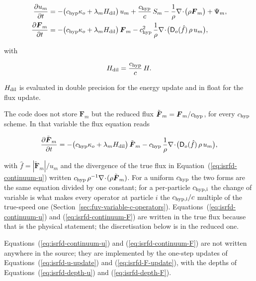 \begin{align}
  \frac{\partial u_m}{\partial t} &=
    -\big(c_{\rm hyp}\kappa_o + \lambda_m H_{\rm dil}\big)\, u_m
    + \frac{c_{\rm hyp}}{c}\, S_m
    - \frac{1}{\rho}\nabla\!\cdot\!\big(\rho \boldsymbol{F}_m\big)
    + \Psi_m,
  \label{eq:isrfd-continuum-u} \\
  \frac{\partial \boldsymbol{F}_m}{\partial t} &=
    -\big(c_{\rm hyp}\kappa_o + \lambda_m H_{\rm dil}\big)\, \boldsymbol{F}_m
    - c_{\rm hyp}^2\, \frac{1}{\rho}\nabla\!\cdot\!
      \big(\mathsf{D}_o(\hat f)\, \rho\, u_m\big),
  \label{eq:isrfd-continuum-F}
\end{align}

with

\begin{equation}
  H_{\rm dil} = \frac{c_{\rm hyp}}{c}\, H .
  \label{eq:isrfd-Hdil}
\end{equation}

$H_{\rm dil}$ is evaluated in double precision for the energy update and in float
for the flux update.

The code does not store $\boldsymbol{F}_m$ but the reduced flux
$\tilde{\boldsymbol{F}}_m = \boldsymbol{F}_m/c_{\rm hyp}$, for every
$c_{\rm hyp}$ scheme. In that variable the flux equation reads

\begin{equation}
  \frac{\partial \tilde{\boldsymbol{F}}_m}{\partial t} =
    -\big(c_{\rm hyp}\kappa_o + \lambda_m H_{\rm dil}\big)\, \tilde{\boldsymbol{F}}_m
    - c_{\rm hyp}\, \frac{1}{\rho}\nabla\!\cdot\!
      \big(\mathsf{D}_o(\hat f)\, \rho\, u_m\big),
  \label{eq:isrfd-continuum-Ft}
\end{equation}

with $\hat f = |\tilde{\boldsymbol{F}}_m|/u_m$ and the divergence of the true
flux in Equation~(\ref{eq:isrfd-continuum-u}) written $c_{\rm hyp}\,
\rho^{-1}\nabla\!\cdot\!(\rho\tilde{\boldsymbol{F}}_m)$. For a uniform
$c_{\rm hyp}$ the two forms are the same equation divided by one constant; for
a per-particle $c_{\rm hyp,i}$ the change of variable is what makes every
operator at particle $i$ the $c_{\rm hyp,i}/c$ multiple of the true-speed one
(Section~\ref{sec:fuv-variable-c-operators}). Equations~(\ref{eq:isrfd-continuum-u}) and
(\ref{eq:isrfd-continuum-F}) are written in the true flux because that is the
physical statement; the discretisation below is in the reduced one.

Equations~(\ref{eq:isrfd-continuum-u}) and (\ref{eq:isrfd-continuum-F}) are
not written anywhere in the source; they are implemented by the one-step updates
of Equations~(\ref{eq:isrfd-u-update}) and (\ref{eq:isrfd-F-update}), with the
depths of Equations~(\ref{eq:isrfd-depth-u}) and (\ref{eq:isrfd-depth-F}).


